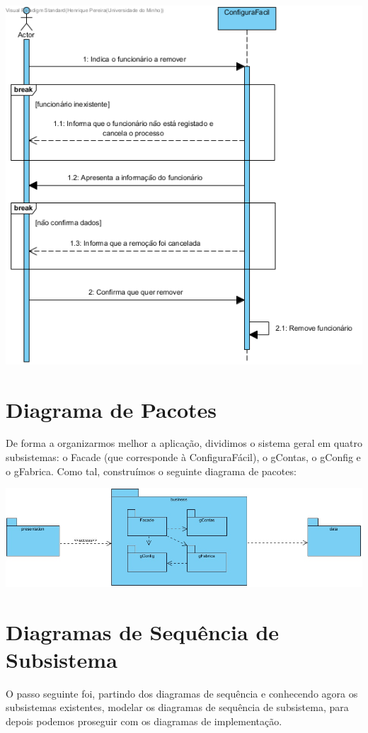 \documentclass[11pt]{article} %
\begin{document}
\begin{enumerate}
\begin{center}
 			\includegraphics[width = 6in]{dss_remover_funcionario.png}
		\end{center}
\end{enumerate}

\section{Diagrama de Pacotes}
De forma a organizarmos melhor a aplicação, dividimos o sistema geral em quatro subsistemas: o Facade (que corresponde à ConfiguraFácil), o gContas, o gConfig e o gFabrica. Como tal, construímos o seguinte diagrama de pacotes:
\begin{center}
 	\includegraphics[width=6in]{pacotes.jpg}
\end{center}

\section{Diagramas de Sequência de Subsistema}
O passo seguinte foi, partindo dos diagramas de sequência e conhecendo agora os subsistemas existentes, modelar os diagramas de sequência de subsistema, para depois podemos proseguir com os diagramas de implementação.
\end{document}
